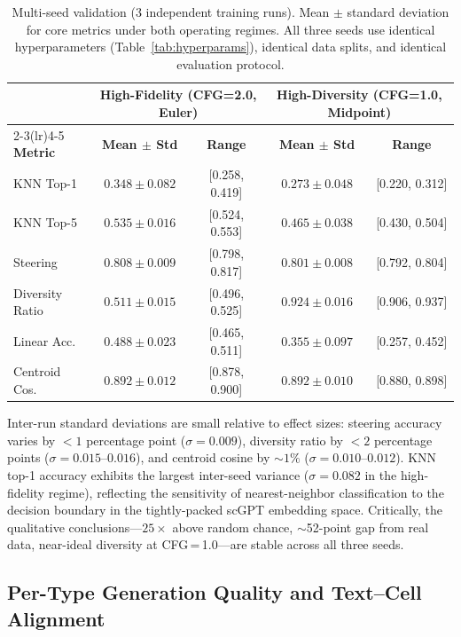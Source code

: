 \documentclass[preprint,12pt]{elsarticle}
\begin{document}
\begin{table}[!htbp]
\caption{Multi-seed validation (3 independent training runs). Mean $\pm$ standard deviation for core metrics under both operating regimes. All three seeds use identical hyperparameters (Table~\ref{tab:hyperparams}), identical data splits, and identical evaluation protocol.\label{tab:multi-seed}}
\centering
\small
\begin{tabular}{lcccc}
\toprule
 & \multicolumn{2}{c}{\textbf{High-Fidelity (CFG=2.0, Euler)}} & \multicolumn{2}{c}{\textbf{High-Diversity (CFG=1.0, Midpoint)}} \\
\cmidrule(lr){2-3}\cmidrule(lr){4-5}
\textbf{Metric} & \textbf{Mean $\pm$ Std} & \textbf{Range} & \textbf{Mean $\pm$ Std} & \textbf{Range} \\
\midrule
KNN Top-1      & $0.348 \pm 0.082$ & [0.258, 0.419] & $0.273 \pm 0.048$ & [0.220, 0.312] \\
KNN Top-5      & $0.535 \pm 0.016$ & [0.524, 0.553] & $0.465 \pm 0.038$ & [0.430, 0.504] \\
Steering       & $0.808 \pm 0.009$ & [0.798, 0.817] & $0.801 \pm 0.008$ & [0.792, 0.804] \\
Diversity Ratio & $0.511 \pm 0.015$ & [0.496, 0.525] & $0.924 \pm 0.016$ & [0.906, 0.937] \\
Linear Acc.    & $0.488 \pm 0.023$ & [0.465, 0.511] & $0.355 \pm 0.097$ & [0.257, 0.452] \\
Centroid Cos.  & $0.892 \pm 0.012$ & [0.878, 0.900] & $0.892 \pm 0.010$ & [0.880, 0.898] \\
\bottomrule
\end{tabular}
\end{table}

Inter-run standard deviations are small relative to effect sizes: steering accuracy varies by $< 1$ percentage point ($\sigma = 0.009$), diversity ratio by $< 2$ percentage points ($\sigma = 0.015$--$0.016$), and centroid cosine by $\sim 1\%$ ($\sigma = 0.010$--$0.012$). KNN top-1 accuracy exhibits the largest inter-seed variance ($\sigma = 0.082$ in the high-fidelity regime), reflecting the sensitivity of nearest-neighbor classification to the decision boundary in the tightly-packed scGPT embedding space. Critically, the qualitative conclusions---$25\times$ above random chance, $\sim$52-point gap from real data, near-ideal diversity at CFG\,=\,1.0---are stable across all three seeds.

\subsection{Per-Type Generation Quality and Text--Cell Alignment}
\end{document}
